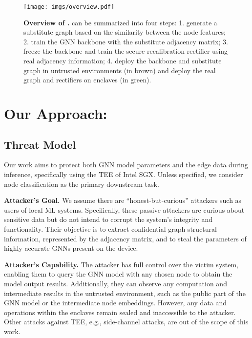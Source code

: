 \begin{figure*}[t]
    \centering
    \texttt{[image: imgs/overview.pdf]}
    \caption{\textbf{Overview of \mymethod.} \mymethod can be summarized into four steps: 1. generate a substitute graph based on the similarity between the node features; 2. train the GNN backbone with the substitute adjacency matrix; 3. freeze the backbone and train the secure recalibration rectifier using real adjacency information; 4. deploy the backbone and substitute graph in untrusted environments (in {\color{brown} brown}) and deploy the real graph and rectifiers on enclaves (in {\color{green!30} green}). }
    \label{fig: overview}
    \vspace{-2mm}
\end{figure*}


\section{Our Approach: \mymethod } \label{sec: method}


\subsection{Threat Model} \label{method: threat model}
Our work aims to protect both GNN model parameters and the edge data during inference, specifically using the TEE of Intel SGX. 
Unless specified, we consider node classification as the primary downstream task.

\noindent\textbf{Attacker's Goal.}
We assume there are ``honest-but-curious'' attackers such as users of local ML systems.
Specifically, these passive attackers are curious about sensitive data but do not intend to corrupt the system’s integrity and functionality. 
Their objective is to extract confidential graph structural information, represented by the adjacency matrix, and to steal the parameters of highly accurate GNNs present on the device.

\noindent\textbf{Attacker's Capability.}
The attacker has full control over the victim system, enabling them to query the GNN model with any chosen node to obtain the model output results. 
Additionally, they can observe any computation and intermediate results in the untrusted environment, such as the public part of the GNN model or the intermediate node embeddings.
However, any data and operations within the enclaves remain sealed and inaccessible to the attacker. 
Other attacks against TEE, e.g., side-channel attacks, are out of the scope of this work.

